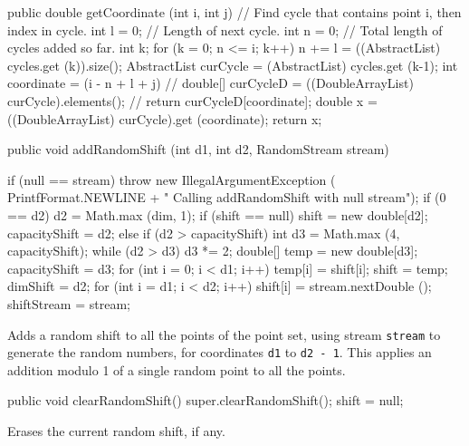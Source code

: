 \begin{code}\begin{hide}

   public double getCoordinate (int i, int j) {
      // Find cycle that contains point i, then index in cycle.
      int l = 0;         // Length of next cycle.
      int n = 0;         // Total length of cycles added so far.
      int k;
      for (k = 0;  n <= i;  k++)
         n += l = ((AbstractList) cycles.get (k)).size();
      AbstractList curCycle = (AbstractList) cycles.get (k-1);
      int coordinate = (i - n + l + j) %
//      double[] curCycleD = ((DoubleArrayList) curCycle).elements();
//      return curCycleD[coordinate];
      double x = ((DoubleArrayList) curCycle).get (coordinate);
      return x;
   }\end{hide}

   public void addRandomShift (int d1, int d2, RandomStream stream)\begin{hide} {
      if (null == stream)
         throw new IllegalArgumentException (
              PrintfFormat.NEWLINE +
              "   Calling addRandomShift with null stream");
      if (0 == d2)
         d2 = Math.max (dim, 1);
      if (shift == null) {
         shift = new double[d2];
         capacityShift = d2;
      } else if (d2 > capacityShift) {
         int d3 = Math.max (4, capacityShift);
         while (d2 > d3)
            d3 *= 2;
         double[] temp = new double[d3];
         capacityShift = d3;
         for (int i = 0; i < d1; i++)
            temp[i] = shift[i];
         shift = temp;
      }
      dimShift = d2;
      for (int i = d1; i < d2; i++)
         shift[i] = stream.nextDouble ();
      shiftStream = stream;
   }\end{hide}
\end{code}
\begin{tabb}  Adds a random shift to all the points
  of the point set, using stream \texttt{stream} to generate the random numbers,
  for coordinates \texttt{d1} to \texttt{d2 - 1}. This applies an addition modulo 1
  of a single random point to all the points.
\end{tabb}
\begin{htmlonly}
\end{htmlonly}
\begin{hide}\begin{code}

   public void clearRandomShift() {
      super.clearRandomShift();
      shift = null;
   }
\end{code}
\begin{tabb}
   Erases the current random shift, if any.
\end{tabb}
\end{hide}
